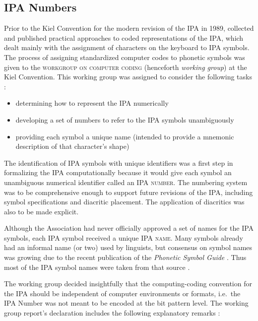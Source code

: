 \subsection*{IPA Numbers}
Prior to the Kiel Convention for the modern revision of the IPA in 1989,
\citet{Wells1987} collected and published practical approaches to coded
representations of the IPA, which dealt mainly with the assignment of characters
on the keyboard to IPA symbols. The process of assigning standardized computer
codes to phonetic symbols was given to the \textsc{workgroup on computer
coding} (henceforth \textit{working group}) at the Kiel Convention. This working
group was assigned to consider the following tasks
\citep{Esling1990,EslingGaylord1993}: 

\begin{itemize}
	\item determining how to represent the IPA numerically
	\item developing a set of numbers to refer to the IPA symbols unambiguously
	\item providing each symbol a unique name (intended to provide a mnemonic description of that character's shape)
\end{itemize}

\noindent The identification of IPA symbols with unique identifiers was 
a first step in formalizing the IPA computationally because it would give 
each symbol an unambiguous numerical identifier called an \textsc{IPA number}. 
The numbering system was to be comprehensive enough to support future revisions 
of the IPA, including symbol specifications and diacritic placement. The 
application of diacritics was also to be made explicit. 

Although the Association had never officially approved a set of names 
for the IPA symbols, each IPA symbol received a unique \textsc{IPA name}. 
Many symbols already had an informal name (or two) used by linguists, but 
consensus on symbol names was growing due to the recent publication of the 
\textit{Phonetic Symbol Guide} \citep{PullumLadusaw1986}. Thus most of the 
IPA symbol names were taken from that source \citep[31]{IPA1999}.

The working group decided insightfully that the computing-coding convention 
for the IPA should be independent of computer environments or formats, 
i.e.\ the IPA Number was not meant to be encoded at the bit pattern level.
The working group report's declaration includes the following explanatory 
remarks \citep[82]{International1989report}:

